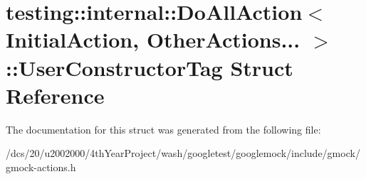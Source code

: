 \hypertarget{structtesting_1_1internal_1_1DoAllAction_3_01InitialAction_00_01OtherActions_8_8_8_01_4_1_1UserConstructorTag}{}\section{testing\+:\+:internal\+:\+:Do\+All\+Action$<$ Initial\+Action, Other\+Actions... $>$\+:\+:User\+Constructor\+Tag Struct Reference}
\label{structtesting_1_1internal_1_1DoAllAction_3_01InitialAction_00_01OtherActions_8_8_8_01_4_1_1UserConstructorTag}


The documentation for this struct was generated from the following file\+:\begin{DoxyCompactItemize}
\item 
/dcs/20/u2002000/4th\+Year\+Project/wash/googletest/googlemock/include/gmock/gmock-\/actions.\+h\end{DoxyCompactItemize}
